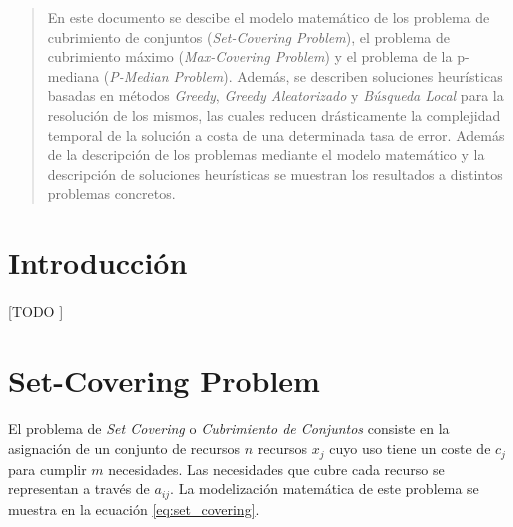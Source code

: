\documentclass[spanish]{article}
\begin{document}
	\maketitle %

	\thispagestyle{fancy} %



	\begin{abstract}
		\noindent En este documento se descibe el modelo matemático de los problema de cubrimiento de conjuntos (\emph{Set-Covering Problem}), el problema de cubrimiento máximo (\emph{Max-Covering Problem}) y el problema de la p-mediana (\emph{P-Median Problem}). Además, se describen soluciones heurísticas basadas en métodos \emph{Greedy}, \emph{Greedy Aleatorizado} y \emph{Búsqueda Local} para la resolución de los mismos, las cuales reducen drásticamente la complejidad temporal de la solución a costa de una determinada tasa de error. Además de la descripción de los problemas mediante el modelo matemático y la descripción de soluciones heurísticas se muestran los resultados a distintos problemas concretos.
	\end{abstract}


	\section{Introducción}

		\paragraph{}
		[TODO ]

	\setcounter{section}{5}

	\section{Set-Covering Problem}
	\label{sec:e-6}

		\paragraph{}
		El problema de \emph{Set Covering} o \emph{Cubrimiento de Conjuntos} consiste en la asignación de un conjunto de recursos $n$ recursos $x_{j}$ cuyo uso tiene un coste de $c_{j}$ para cumplir $m$ necesidades. Las necesidades que cubre cada recurso se representan a través de $a_{ij}$. La modelización matemática de este problema se muestra en la ecuación \eqref{eq:set_covering}.
\end{document}
